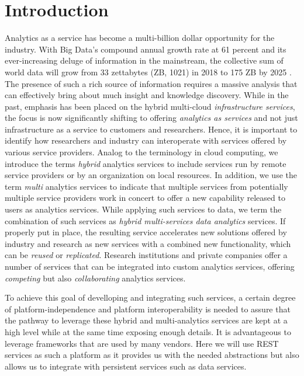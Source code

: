 
\section{Introduction}
\label{sec:summary}


Analytics as a service has become a multi-billion dollar opportunity
for the  industry. With Big Data's compound annual growth rate at 61
percent and its ever-increasing deluge of information in the
mainstream, the collective sum of world data will grow from 33
zettabytes (ZB, 1021) in 2018 to 175 ZB by 2025 \cite{www-idc-forecast}.
The presence of such a rich source
of information requires a massive analysis that can effectively bring
about much insight and knowledge discovery. While in the past, emphasis has been placed on the hybrid multi-cloud {\em infrastructure
services}, the focus is now significantly shifting to offering {\em
analytics as services} and not just infrastructure as a service to
customers and researchers. Hence, it is important to identify how
researchers and industry can interoperate with services offered by
various service providers. Analog to the terminology in cloud
computing, we introduce the terms {\em hybrid} analytics services to
include services run by remote service providers or by an organization
on local resources. In addition, we use the term {\em multi}
analytics services to indicate that multiple services from potentially
multiple service providers work in concert to offer a new capability
released to users as analytics services. While applying such services
to data, we term the combination of such services as {\em hybrid
multi-services data analytics} services. If properly put in place, the
resulting service accelerates new solutions offered by industry and
research as new services with a combined new functionality, which can
be {\em reused} or {\em replicated}. Research institutions and private
companies offer a number of services that can be integrated into
custom analytics services, offering {\em competing} but also {\em
collaborating} analytics services.

To achieve this goal of develloping and integrating such services, a certain degree of platform-independence and
platform interoperability is needed to assure that the pathway to
leverage these hybrid and multi-analytics services are kept at a high
level while at the same time exposing enough details. 
It is advantageous to leverage frameworks that are used by many vendors. Here
we will use REST services as such a platform as it provides us with
the needed abstractions but also allows us to integrate with
persistent services such as data services.

